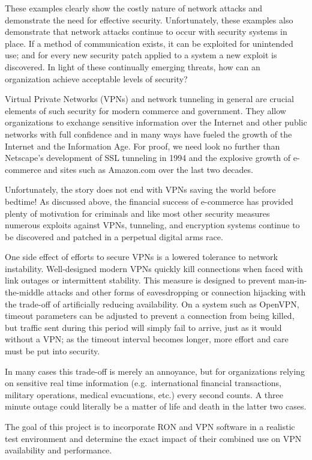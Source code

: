 These examples clearly show the costly nature of network attacks and
demonstrate the need for effective security.  Unfortunately, these examples
also demonstrate that network attacks continue to occur with security
systems in place. If a method of communication exists, it can be exploited
for unintended use; and for every new security patch applied to a system a
new exploit is discovered. In light of these continually emerging threats,
how can an organization achieve acceptable levels of security?

Virtual Private Networks (VPNs) and network tunneling in general are
crucial elements of such security for modern commerce and government.  They
allow organizations to exchange sensitive information over the Internet and
other public networks with full confidence and in many ways have fueled the
growth of the Internet and the Information Age.  For proof, we need look no
further than Netscape's development of SSL tunneling in 1994 and the
explosive growth of e-commerce and sites such as Amazon.com over the last
two decades.

Unfortunately, the story does not end with VPNs saving the world before
bedtime!  As discussed above, the financial success of e-commerce has
provided plenty of motivation for criminals and like most other security
measures numerous exploits against VPNs, tunneling, and encryption systems
continue to be discovered and patched in a perpetual digital arms race.

One side effect of efforts to secure VPNs is a lowered tolerance to network
instability.  Well-designed modern VPNs quickly kill connections when faced
with link outages or intermittent stability.  This measure is designed to
prevent man-in-the-middle attacks and other forms of eavesdropping or
connection hijacking with the trade-off of artificially reducing
availability.  On a system such as OpenVPN, timeout parameters can be
adjusted to prevent a connection from being killed, but traffic sent during
this period will simply fail to arrive, just as it would without a VPN; as
the timeout interval becomes longer, more effort and care must be put into security.

In many cases this trade-off is merely an annoyance, but for organizations
relying on sensitive real time information (e.g.\ international financial
transactions, military operations, medical evacuations, etc.) every second
counts.  A three minute outage could literally be a matter of life and
death in the latter two cases.

The goal of this project is to incorporate RON and VPN software in a
realistic test environment and determine the exact impact of their combined
use on VPN availability and performance.



